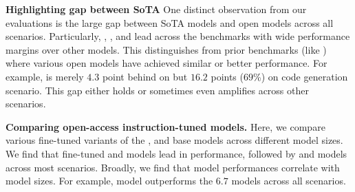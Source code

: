 

\textbf{Highlighting gap between SoTA}
One distinct observation from our evaluations is the large gap between SoTA models and open models across all scenarios.
Particularly, \gptfourturbo{}, \gptfour{}, \geminiproonefive{} and \claudeopus{} lead across the benchmarks with wide performance margins over other models.
This distinguishes \livecodebench{} from prior benchmarks (like \humaneval{}) where various open models have achieved similar or better performance. 
For example,  is merely $4.3$ point behind \gptfourturbo{} on \humanevalplus{} but 
$16.2$ points ($69$\%) on \lcb{} code generation scenario.
This gap either holds or sometimes even amplifies across other scenarios.


\noindent \textbf{Comparing open-access instruction-tuned models.}
Here, we compare various fine-tuned variants of the \llamabase{}, \deepseek{} and \cllama{} base models across different model sizes.
We find that fine-tuned \llamabase{} and \deepseek{} models lead in performance, followed by \phind{} and \cllama{} models across most scenarios.
Broadly, we find that model performances correlate with model sizes. For example, \phind{} model outperforms the $6.7$ models across all scenarios.%

